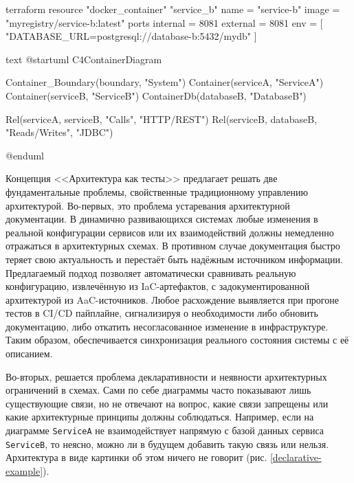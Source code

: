 \begin{listing}[ht]
\begin{codenl}{terraform}
    resource "docker_container" "service_b" {
      name  = "service-b"
      image = "myregistry/service-b:latest"
      ports {
        internal = 8081
        external = 8081
      }
      env = [
        "DATABASE_URL=postgresql://database-b:5432/mydb"
      ]
    }    
\end{codenl}
\caption{Пример простой Terraform-конфигурации.}
\label{iac-example}
\end{listing}

\begin{listing}[ht]
\begin{codenl}{text}
    @startuml C4ContainerDiagram
    
    Container_Boundary(boundary, "System") {
        Container(serviceA, "ServiceA")
        Container(serviceB, "ServiceB")
        ContainerDb(databaseB, "DatabaseB")
    }
    
    Rel(serviceA, serviceB, "Calls", "HTTP/REST")
    Rel(serviceB, databaseB, "Reads/Writes", "JDBC")
    
    @enduml
\end{codenl}
\caption{Пример PlantUML-диаграммы в формате C4 Model.}
\label{aac-example}
\end{listing}

Концепция <<Архитектура как тесты>> предлагает решать две фундаментальные проблемы, свойственные традиционному управлению архитектурой. Во-первых, это проблема устаревания архитектурной документации. В динамично развивающихся системах любые изменения в реальной конфигурации сервисов или их взаимодействий должны немедленно отражаться в архитектурных схемах. В противном случае документация быстро теряет свою актуальность и перестаёт быть надёжным источником информации. Предлагаемый подход позволяет автоматически сравнивать реальную конфигурацию, извлечённую из IaC-артефактов, с задокументированной архитектурой из AaC-источников. Любое расхождение выявляется при прогоне тестов в CI/CD пайплайне, сигнализируя о необходимости либо обновить документацию, либо откатить несогласованное изменение в инфраструктуре. Таким образом, обеспечивается синхронизация реального состояния системы с её описанием.

Во-вторых, решается проблема декларативности и неявности архитектурных ограничений в схемах. Сами по себе диаграммы часто показывают лишь существующие связи, но не отвечают на вопрос, какие связи запрещены или какие архитектурные принципы должны соблюдаться. Например, если на диаграмме \verb|ServiceA| не взаимодействует напрямую с базой данных сервиса \verb|ServiceB|, то неясно, можно ли в будущем добавить такую связь или нельзя. Архитектура в виде картинки об этом ничего не говорит (рис. \ref{declarative-example}).

